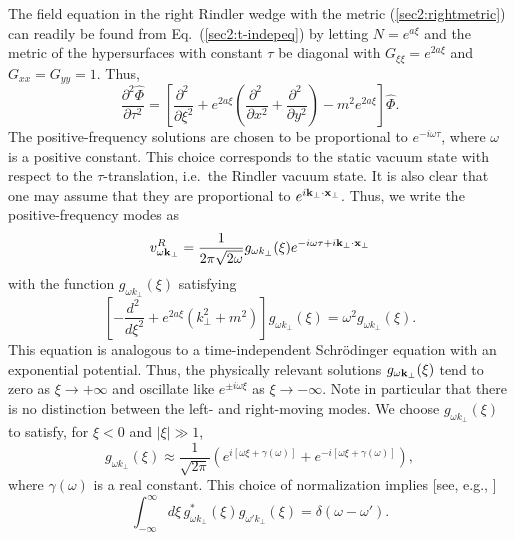 \documentclass[12pt,nofootinbib,floatfix,aps,prd,showpacs,amsmath,amssymb,eqsecnum]{revtex4-2}
\begin{document}
The field equation in the right Rindler wedge with the metric 
(\ref{sec2:rightmetric}) can readily be found from
Eq.~(\ref{sec2:t-indepeq}) by letting 
$N=e^{a\xi}$ and the metric of the hypersurfaces with constant $\tau$
be diagonal 
with $G_{\xi\xi} = e^{2a\xi}$ and $G_{xx}=G_{yy} = 1$.  Thus, 
\begin{equation}
\frac{\partial^2\hat{\Phi}}{\partial \tau^2}
= \left[ \frac{\partial^2\ }{\partial \xi^2}
+ e^{2a\xi}\left(\frac{\partial^2\ }{\partial x^2}
+ \frac{\partial^2\ }{\partial y^2}\right) - m^2 e^{2a\xi}
\right]\hat{\Phi}.
\end{equation}
The positive-frequency solutions
are chosen to be proportional to $e^{-i\omega\tau}$, 
where $\omega$ is a positive 
constant. This choice corresponds to the static vacuum state with
respect to the $\tau$-translation, i.e.~the Rindler vacuum state.
It is also clear that one may assume that
they are proportional to $e^{i{\bf k}_\perp\cdot{\bf x}_\perp}$.  
Thus, we write the positive-frequency modes as 
\begin{equation}
v^R_{\omega{\bf k}_\perp} 
= \frac{1}{2\pi\sqrt{2\omega}} 
g_{\omega  k_\perp}(\xi)e^{-i\omega\tau+ 
i{\bf k}_\perp\cdot{\bf x}_\perp}
\end{equation}
with the function $g_{\omega k_\perp}(\xi)$ satisfying
\begin{equation}
\left[ -\frac{d^2\ }{d\xi^2} 
 + e^{2a\xi}(k_\perp^2 + m^2)\right]
g_{\omega k_\perp}(\xi) = \omega^2 g_{\omega k_\perp}(\xi). 
\label{sec2:bessel}
\end{equation}
This equation is analogous to a time-independent Schr\"{o}dinger 
equation with an exponential potential.  Thus, the physically relevant 
solutions $g_{\omega{\bf k}_\perp}(\xi)$ tend to zero as 
$\xi\to +\infty$ and oscillate like $e^{\pm i\omega \xi}$ as 
$\xi \to -\infty$.  Note in particular that there is no distinction
between the left- and right-moving modes.
We choose $g_{\omega k_\perp}(\xi)$ to satisfy, for $\xi <0$ and 
$|\xi| \gg 1$,
\begin{equation}
g_{\omega k_\perp}(\xi) \approx 
\frac{1}{\sqrt{2\pi}}( e^{i[\omega\xi+\gamma(\omega)]} + 
e^{-i[\omega\xi + \gamma(\omega)]}), \label{sec2:normalization}
\end{equation}
where $\gamma(\omega)$ 
is a real constant. This choice of normalization implies
[see, e.g., \textcite{Fullingbook89}]
\begin{equation}
\int_{-\infty}^{\infty}d\xi\, g^*_{\omega k_\perp}(\xi)
g_{\omega' k_\perp}(\xi) = 
\delta(\omega-\omega').  \label{sec2:delta-normal}
\end{equation}
\end{document}
